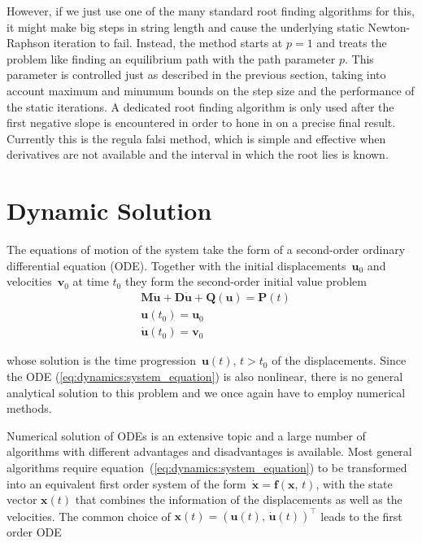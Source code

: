 However, if we just use one of the many standard root finding algorithms for this, it might make big steps in string length and cause the underlying static Newton-Raphson iteration to fail.
Instead, the method starts at $p = 1$ and treats the problem like finding an equilibrium path with the path parameter $p$.
This parameter is controlled just as described in the previous section, taking into account maximum and minumum bounds on the step size and the performance of the static iterations.
A dedicated root finding algorithm is only used after the first negative slope is encountered in order to hone in on a precise final result.
Currently this is the regula falsi method, which is simple and effective when derivatives are not available and the interval in which the root lies is known.

\newpage
\section{Dynamic Solution}

The equations of motion of the system take the form of a second-order ordinary differential equation (ODE).
Together with the initial displacements~$\boldsymbol{u}_0$ and velocities~$\mathbf{v}_0$ at time $t_0$ they form the second-order initial value problem
%
\begin{align}
&\boldsymbol{M}\ddot{\boldsymbol{u}} + \boldsymbol{D}\dot{\boldsymbol{u}} + \boldsymbol{Q}(\boldsymbol{u}) = \boldsymbol{P}(t) \label{eq:dynamics:system_equation} \\
&\boldsymbol{u}(t_0) = \boldsymbol{u}_0 \\
&\dot{\boldsymbol{u}}(t_0) = \mathbf{v}_0
\end{align}

whose solution is the time progression~$\boldsymbol{u}(t),\,t > t_0$ of the displacements.
Since the ODE (\ref{eq:dynamics:system_equation}) is also nonlinear, there is no general analytical solution to this problem and we once again have to employ numerical methods.

Numerical solution of ODEs is an extensive topic and a large number of algorithms with different advantages and disadvantages is available.
Most general algorithms require equation~(\ref{eq:dynamics:system_equation}) to be transformed into an equivalent first order system of the form~$\dot{\boldsymbol{x}} = \boldsymbol{f}(\boldsymbol{x},\,t)$, with the state vector $\boldsymbol{x}(t)$ that combines the information of the displacements as well as the velocities.
The common choice of $\boldsymbol{x}(t) = (\boldsymbol{u}(t),\,\dot{\boldsymbol{u}}(t))^\intercal$ leads to the first order ODE

